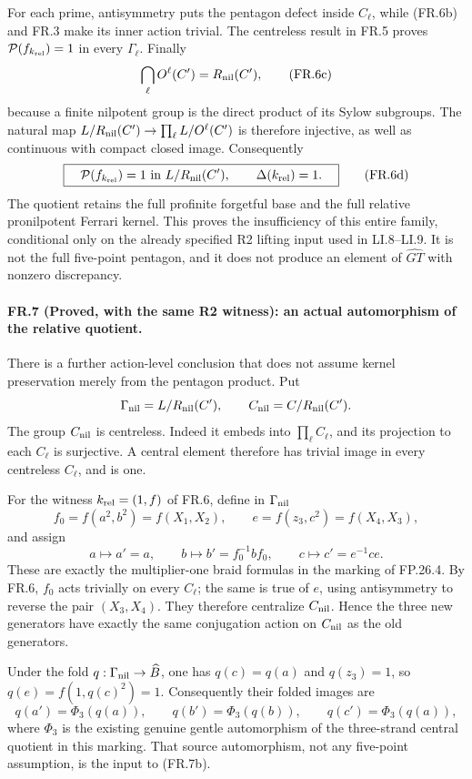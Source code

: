 For each prime, antisymmetry puts the pentagon defect inside
$C_\ell$, while (FR.6b) and FR.3 make its inner action trivial.
The centreless result in FR.5 proves
$\mathcal P(f_{k_{\rm rel}})=1$ in every $\Gamma_\ell$.
Finally
\[
       \bigcap_\ell O^\ell(C')=R_{\rm nil}(C'),
 \tag{FR.6c}
\]
because a finite nilpotent group is the direct product of its
Sylow subgroups. The natural map
$L/R_{\rm nil}(C')\to\prod_\ell L/O^\ell(C')$ is therefore
injective, as well as continuous with compact closed image.
Consequently
\[
 \boxed{\quad\mathcal P(f_{k_{\rm rel}})=1
           \text{ in }L/R_{\rm nil}(C'),\qquad
           \Delta(k_{\rm rel})=1.\quad}
 \tag{FR.6d}
\]
The quotient retains the full profinite forgetful base and
the full relative pronilpotent Ferrari kernel. This proves
the insufficiency of this entire family, conditional only
on the already specified R2 lifting input used in LI.8--LI.9.
It is not the full five-point pentagon, and it does not
produce an element of $\widehat{GT}$ with nonzero discrepancy.

\paragraph{FR.7 (Proved, with the same R2 witness): an actual automorphism of the relative quotient.}
There is a further action-level conclusion that does not assume
kernel preservation merely from the pentagon product. Put
\[
 \Gamma_{\rm nil}=L/R_{\rm nil}(C'),\qquad
 C_{\rm nil}=C/R_{\rm nil}(C').
\]
The group $C_{\rm nil}$ is centreless. Indeed it embeds into
$\prod_\ell C_\ell$, and its projection to each $C_\ell$
is surjective. A central element therefore has trivial image
in every centreless $C_\ell$, and is one.

For the witness $k_{\rm rel}=(1,f)$ of FR.6, define in
$\Gamma_{\rm nil}$
\[
 f_0=f(a^2,b^2)=f(X_1,X_2),\qquad
 e=f(z_3,c^2)=f(X_4,X_3),
\]
and assign
\[
       a\longmapsto a'=a,\qquad
       b\longmapsto b'=f_0^{-1}bf_0,\qquad
       c\longmapsto c'=e^{-1}ce.
 \tag{FR.7a}
\]
These are exactly the multiplier-one braid formulas in
the marking of FP.26.4. By FR.6, $f_0$ acts trivially on
every $C_\ell$; the same is true of $e$, using antisymmetry
to reverse the pair $(X_3,X_4)$. They therefore centralize
$C_{\rm nil}$. Hence the three new generators have exactly
the same conjugation action on $C_{\rm nil}$ as the old
generators.

Under the fold $q:\Gamma_{\rm nil}\to\widehat B$, one has
$q(c)=q(a)$ and $q(z_3)=1$, so $q(e)=f(1,q(c)^2)=1$.
Consequently their folded images are
\[
 q(a')=\Phi_3(q(a)),\qquad
 q(b')=\Phi_3(q(b)),\qquad
 q(c')=\Phi_3(q(a)),
 \tag{FR.7b}
\]
where $\Phi_3$ is the existing genuine gentle automorphism
of the three-strand central quotient in this marking.
That source automorphism, not any five-point assumption,
is the input to (FR.7b).

